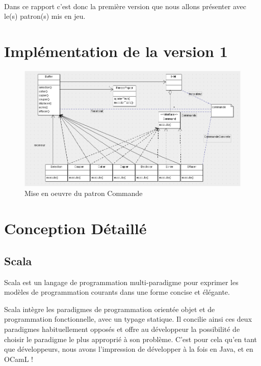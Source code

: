 \documentclass[a4paper,11pt]{article}
\begin{document}
\paragraph{}
Dans ce rapport c'est donc la première version que nous allons présenter avec le(s) patron(s) mis en jeu.

\section{Implémentation de la version 1}


\begin{figure}[!ht]
		\center
		\includegraphics [width=15cm]{./images/Command.png}
		\caption{Mise en oeuvre du patron Commande}
\end{figure}




\section{Conception Détaillé}

\subsection{Scala}

Scala est un langage de programmation multi-paradigme pour exprimer les modèles de programmation courants dans une forme concise et élégante.

Scala intègre les paradigmes de programmation orientée objet et de programmation fonctionnelle, avec un typage statique. Il concilie ainsi ces deux paradigmes habituellement opposés et offre au développeur la possibilité de choisir le paradigme le plus approprié à son problème. C'est pour cela qu'en tant que développeurs, nous avons l'impression de développer à la fois en Java, et en OCamL !
\end{document}
